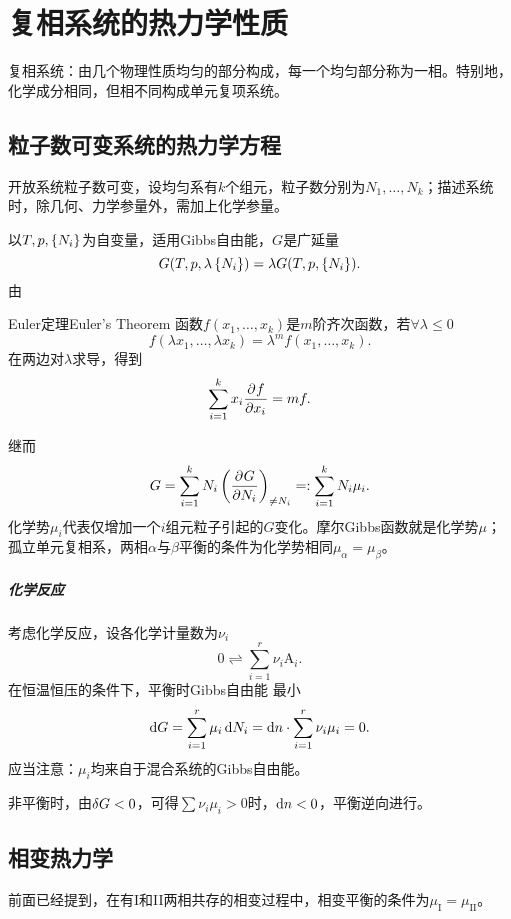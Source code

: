 \chapter{复相系统的热力学性质}
复相系统：由几个物理性质均匀的部分构成，每一个均匀部分称为一相。特别地，化学成分相同，但相不同构成单元复项系统。
\section{粒子数可变系统的热力学方程}
开放系统粒子数可变，设均匀系有$k$个组元，粒子数分别为$N_1,\ldots,N_k$；描述系统时，除几何、力学参量外，需加上化学参量。

以$T,p,\left\{N_i\right\}$为自变量，适用Gibbs自由能，$G$是广延量
\[
	G(T,p,\lambda\left\{N_i\right\})=\lambda G(T,p,\left\{N_i\right\}).
\]
由
\begin{theorem}{Euler定理}{Euler's Theorem}
	函数$f(x_1,\ldots,x_k)$是$m$阶齐次函数，若$\forall\lambda\leqslant 0$
	\[
		f(\lambda x_1,\ldots,\lambda x_k)=\lambda^mf(x_1,\ldots,x_k).
	\]
	在两边对$\lambda$求导，得到
	\[
		\sum_{i=1}^kx_i\frac{\partial^{{}}f}{\partial{x_i}^{{}}}=mf.
	\]
\end{theorem}
继而
\[
	G=\sum_{i=1}^kN_i\left(\frac{\partial^{{}}G}{\partial{N_i}^{{}}}\right)_{\neq N_i}=:\sum_{i=1}^kN_i\mu_i.
\]
化学势$\mu_i$代表仅增加一个$i$组元粒子引起的$G$变化。摩尔Gibbs函数就是化学势$\mu$；孤立单元复相系，两相$\alpha$与$\beta$平衡的条件为化学势相同$\mu_\alpha=\mu_\beta$。
\paragraph{化学反应}
考虑化学反应，设各化学计量数为$\nu_i$
\[
	0\rightleftharpoons\sum_{i=1}^r\nu_i{\mathrm A}_i.
\]
在恒温恒压的条件下，平衡时Gibbs自由能%
最小
\begin{align}
	\mathop{}\!\mathrm{d} G=\sum_{i=1}^r\mu_i\mathop{}\!\mathrm{d} N_i=\mathop{}\!\mathrm{d} n\cdot\sum_{i=1}^r\nu_i\mu_i=0.
\end{align}
应当注意：$\mu_i$均来自于混合系统的Gibbs自由能。

非平衡时，由$\mathop{}\!\delta G<0$，可得$\textstyle\sum\nu_i\mu_i>0$时，$\mathop{}\!\mathrm{d} n<0$，平衡逆向进行。
\iffalse
考虑一个由理想气体参与的化学反应，理想气体的化学势
\[
	\mu_i=RT\ln p_i+\const(T).
\]
带入上式可得，有
\[
	\sum_{i=1}^r\nu_iRT\ln p_i=\const(T).
\]
又$p=RT\zkh{{\rm A}_i}$，%
\begin{align}
	\prod_{i=1}^r\zkh{{\rm A}_i}^{\nu_i}=:K(T).
\end{align}
$K$称为化学平衡常数，是$T$的函数。
\fi
\section{相变热力学}
前面已经提到，在有I和II两相共存的相变过程中，相变平衡的条件为$\mu_\mathrm I=\mu_\mathrm{II}$。


